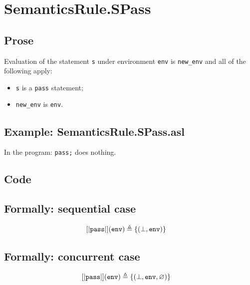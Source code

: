 \documentclass{book}
\begin{document}
\section{SemanticsRule.SPass \label{sec:SemanticsRule.SPass}}

  \subsection{Prose}
  Evaluation of the statement \texttt{s} under environment \texttt{env} is
\texttt{new\_env} and all of the following apply:
  \begin{itemize}
  \item \texttt{s} is a \texttt{pass} statement;
  \item \texttt{new\_env} is \texttt{env}.
  \end{itemize}

  \subsection{Example: SemanticsRule.SPass.asl}
  In the program:
  \texttt{pass;} does nothing.

  \subsection{Code}

\begin{formal}
  \subsection{Formally: sequential case}
  \begin{align}
  \left[| \mathtt{pass} \right|] (\texttt{env}) & \triangleq \{ (\bot, \texttt{env}) \}
  \label{eq:sem-seq-spass}
\end{align} 

  \subsection{Formally: concurrent case}
  \begin{align}
  \left[| \mathtt{pass} \right|] (\texttt{env}) & \triangleq \{ (\bot, \texttt{env}, \varnothing) \}
  \label{eq:sem-conc-spass}
  \end{align} 
\end{formal}
\end{document}
